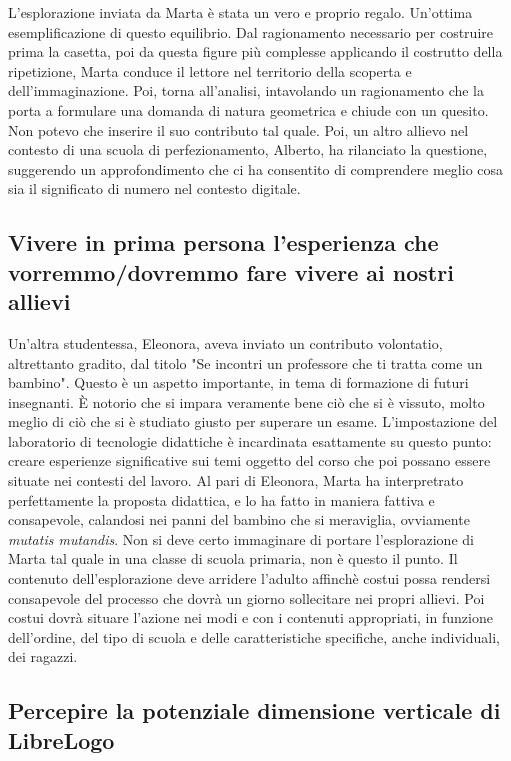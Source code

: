 L'esplorazione inviata da Marta è stata un vero e proprio regalo. Un'ottima
esemplificazione di questo equilibrio. Dal ragionamento necessario per
costruire prima la casetta, poi da questa figure più complesse applicando il
costrutto della ripetizione, Marta conduce il lettore nel territorio della
scoperta e dell'immaginazione. Poi, torna all'analisi, intavolando un
ragionamento che la porta a formulare una domanda di natura geometrica e chiude
con un quesito. Non potevo che inserire il suo contributo tal quale. Poi, un altro
allievo nel contesto di una scuola di perfezionamento, Alberto, ha rilanciato
la questione, suggerendo un approfondimento che ci ha consentito di comprendere
meglio cosa sia il significato di numero nel contesto digitale.

\subsection{Vivere in prima persona l'esperienza che vorremmo/dovremmo fare vivere ai
nostri allievi}

Un'altra studentessa, Eleonora, aveva inviato un contributo volontatio, altrettanto
gradito, dal titolo "Se incontri un professore che ti tratta come un bambino". Questo è un
aspetto importante, in tema di formazione di futuri insegnanti. È notorio che
si impara veramente bene ciò che si è vissuto, molto meglio di ciò che si è
studiato giusto per superare un esame. L'impostazione del laboratorio di
tecnologie didattiche è incardinata esattamente su questo punto: creare
esperienze significative sui temi oggetto del corso che poi possano essere
situate nei contesti del lavoro. Al pari di Eleonora, Marta ha interpretrato perfettamente la proposta didattica, e lo ha fatto in maniera fattiva e consapevole, calandosi nei panni del bambino che si meraviglia, ovviamente \textit{mutatis mutandis}. Non si deve certo immaginare di portare l'esplorazione di Marta tal quale in una classe di scuola primaria, non è questo il punto. Il contenuto dell'esplorazione deve arridere l'adulto affinchè costui possa rendersi consapevole del processo che dovrà un giorno sollecitare nei propri allievi. Poi costui dovrà situare l'azione nei modi e con i contenuti appropriati, in funzione dell'ordine, del tipo di scuola e delle caratteristiche specifiche, anche individuali, dei ragazzi.

\subsection{Percepire la potenziale dimensione verticale di LibreLogo}

